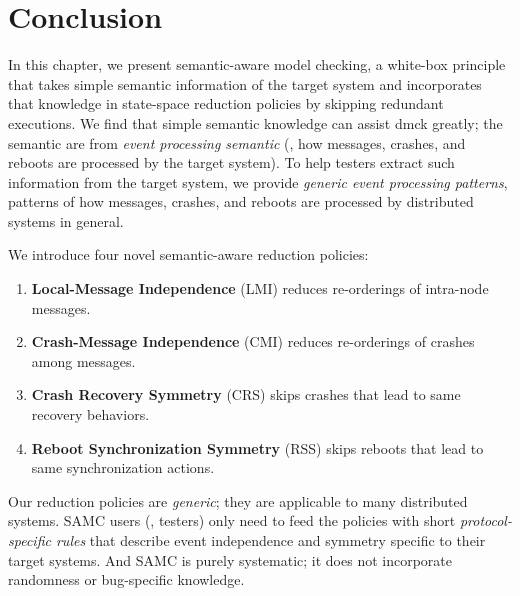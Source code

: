 \section{Conclusion}

In this chapter, we present semantic-aware model checking, a white-box principle
that takes simple semantic information of the target system and incorporates
that knowledge in state-space reduction policies by skipping redundant
executions. We find that simple semantic knowledge can assist dmck greatly; the
semantic are from \textit{event processing semantic} (\ie, how messages,
crashes, and reboots are processed by the target system). To help testers
extract such information from the target system, we provide \textit{generic
event processing patterns}, patterns of how messages, crashes, and reboots are
processed by distributed systems in general.

We introduce four novel semantic-aware reduction policies: 
\begin{enumerate}

\item {\bf Local-Message Independence} (LMI) reduces re-orderings of intra-node
messages. 

\item {\bf Crash-Message Independence} (CMI) reduces re-orderings of crashes
among messages.  

\item {\bf Crash Recovery Symmetry} (CRS) skips crashes that lead to same
recovery behaviors.

\item {\bf Reboot Synchronization Symmetry} (RSS) skips reboots that lead to
same synchronization actions.  

\end{enumerate}
Our reduction policies are {\em generic}; they are applicable to many
distributed systems. SAMC users (\ie, testers) only need to feed the policies
with short {\em protocol-specific rules} that describe event independence and
symmetry specific to their target systems. And SAMC is purely systematic; it
does not incorporate randomness or bug-specific knowledge.


